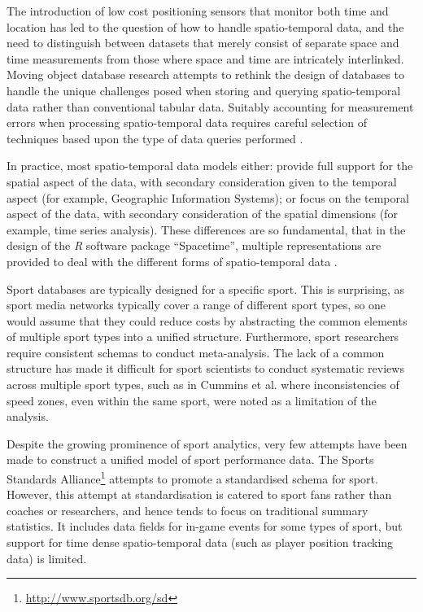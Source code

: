 The introduction of low cost positioning sensors that monitor both time
and location has led to the question of how to handle spatio-temporal
data, and the need to distinguish between datasets that merely consist
of separate space and time measurements from those where space and time
are intricately interlinked. Moving object database research \cite{schneider2009moving} attempts to rethink the design of databases to handle the unique challenges posed when storing and querying spatio-temporal data rather than conventional tabular data. Suitably accounting for measurement errors when processing spatio-temporal data requires
careful selection of techniques based upon the type of data queries
performed \cite{cao2006spatiotemporal}.

In practice, most spatio-temporal data models either: provide full
support for the spatial aspect of the data, with secondary consideration
given to the temporal aspect (for example, Geographic Information
Systems); or focus on the temporal aspect of the data, with secondary
consideration of the spatial dimensions (for example, time series
analysis). These differences are so fundamental, that in the design of
the \textit{R} software package ``Spacetime'', multiple representations are
provided to deal with the different forms of spatio-temporal data
\cite{pebesma2012spacetime}.

Sport databases are typically designed for a specific sport. This is
surprising, as sport media networks typically cover a range of different sport types,
so one would assume that they could reduce costs by abstracting the
common elements of multiple sport types into a unified structure.
Furthermore, sport researchers require consistent schemas to conduct
meta-analysis. The lack of a common structure has made it difficult for
sport scientists to conduct systematic reviews across multiple sport types,
such as in Cummins et al. \cite{Cummins2013} where inconsistencies of speed
zones, even within the same sport, were noted as a limitation of the
analysis.


Despite the growing prominence of sport analytics, very few attempts
have been made to construct a unified model of sport performance data. The Sports Standards Alliance\footnote{\url{http://www.sportsdb.org/sd}}
attempts to promote a standardised schema for sport. However, this
attempt at standardisation is catered to sport fans rather than
coaches or researchers, and hence tends to focus on traditional summary statistics. It includes data fields for in-game events for some types of sport, but support for time dense spatio-temporal data (such as player position tracking data) is limited.


